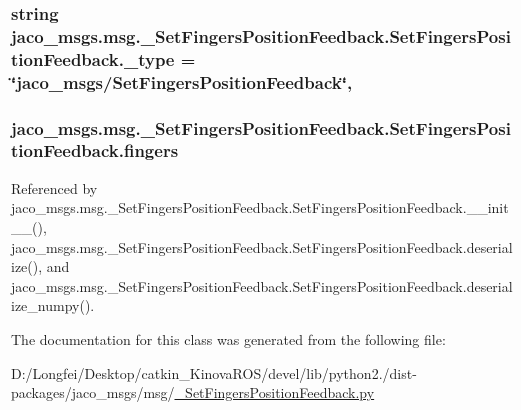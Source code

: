 \subsubsection[{\texorpdfstring{\+\_\+type}{_type}}]{\setlength{\rightskip}{0pt plus 5cm}string jaco\+\_\+msgs.\+msg.\+\_\+\+Set\+Fingers\+Position\+Feedback.\+Set\+Fingers\+Position\+Feedback.\+\_\+type = \char`\"{}jaco\+\_\+msgs/{\bf Set\+Fingers\+Position\+Feedback}\char`\"{}\hspace{0.3cm}{\ttfamily [static]}, {\ttfamily [private]}}\hypertarget{classjaco__msgs_1_1msg_1_1__SetFingersPositionFeedback_1_1SetFingersPositionFeedback_a1ada59eb9dfc3cc4e7abc71f77275f14}{}\label{classjaco__msgs_1_1msg_1_1__SetFingersPositionFeedback_1_1SetFingersPositionFeedback_a1ada59eb9dfc3cc4e7abc71f77275f14}
\subsubsection[{\texorpdfstring{fingers}{fingers}}]{\setlength{\rightskip}{0pt plus 5cm}jaco\+\_\+msgs.\+msg.\+\_\+\+Set\+Fingers\+Position\+Feedback.\+Set\+Fingers\+Position\+Feedback.\+fingers}\hypertarget{classjaco__msgs_1_1msg_1_1__SetFingersPositionFeedback_1_1SetFingersPositionFeedback_aa84e44e4961d47b71b528f18cfb0805b}{}\label{classjaco__msgs_1_1msg_1_1__SetFingersPositionFeedback_1_1SetFingersPositionFeedback_aa84e44e4961d47b71b528f18cfb0805b}


Referenced by jaco\+\_\+msgs.\+msg.\+\_\+\+Set\+Fingers\+Position\+Feedback.\+Set\+Fingers\+Position\+Feedback.\+\_\+\+\_\+init\+\_\+\+\_\+(), jaco\+\_\+msgs.\+msg.\+\_\+\+Set\+Fingers\+Position\+Feedback.\+Set\+Fingers\+Position\+Feedback.\+deserialize(), and jaco\+\_\+msgs.\+msg.\+\_\+\+Set\+Fingers\+Position\+Feedback.\+Set\+Fingers\+Position\+Feedback.\+deserialize\+\_\+numpy().



The documentation for this class was generated from the following file\+:\begin{DoxyCompactItemize}
\item 
D\+:/\+Longfei/\+Desktop/catkin\+\_\+\+Kinova\+R\+O\+S/devel/lib/python2./dist-\/packages/jaco\+\_\+msgs/msg/\hyperlink{__SetFingersPositionFeedback_8py}{\+\_\+\+Set\+Fingers\+Position\+Feedback.\+py}\end{DoxyCompactItemize}
